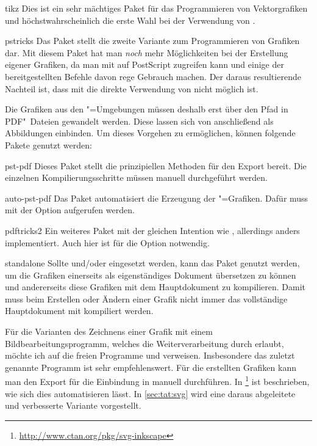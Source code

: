 \documentclass[%
  english,ngerman,%
  headings=optiontoheadandtoc,captions=tableheading,numbers=noenddot,%
  chapterpage,cdfoot,%
]{tudscrman}
\begin{document}
\begin{packages}
\item[tikz]
  Dies ist ein sehr mächtiges Paket für das Programmieren von Vektorgrafiken und 
  höchstwahrscheinlich die erste Wahl bei der Verwendung von .
\item[pstricks]
  Das Paket  stellt die zweite Variante zum Programmieren von 
  Grafiken dar. Mit diesem Paket hat man \emph{noch} mehr Möglichkeiten bei der 
  Erstellung eigener Grafiken, da man mit  auf PostScript 
  zugreifen kann und einige der bereitgestellten Befehle davon rege Gebrauch 
  machen. Der daraus resultierende Nachteil ist, dass mit  
  die direkte Verwendung von  nicht möglich ist.
  
  Die Grafiken aus den "=Umgebungen müssen deshalb erst 
  über den Pfad 
  in PDF"~Dateien gewandelt werden. Diese lassen sich von    
  anschließend als Abbildungen einbinden. Um dieses Vorgehen zu ermöglichen, 
  können folgende Pakete genutzt werden:
  \begin{packages}
  \item[pst-pdf]
    Dieses Paket stellt die prinzipiellen Methoden für den Export bereit. Die 
    einzelnen Kompilierungsschritte müssen manuell durchgeführt werden.
  \item[auto-pst-pdf]
    Das Paket automatisiert die Erzeugung der "=Grafiken. 
    Dafür muss  mit der Option     
    aufgerufen werden.
  \item[pdftricks2]
    Ein weiteres Paket mit der gleichen Intention wie , 
    allerdings anders implementiert. Auch hier ist für  die 
    Option  notwendig.
  \end{packages}
\item[standalone]
  Sollte  und/oder  eingesetzt werden, kann 
  das Paket  genutzt werden, um die Grafiken einerseits als 
  eigenständiges Dokument übersetzen zu können und andererseits diese Grafiken 
  mit dem Hauptdokument zu kompilieren. Damit muss beim Erstellen oder Ändern 
  einer Grafik nicht immer das vollständige Hauptdokument mit kompiliert werden.
\end{packages}
%
Für die Varianten des Zeichnens einer Grafik mit einem Bildbearbeitungsprogramm, 
welches die Weiterverarbeitung durch  erlaubt, möchte ich auf die 
freien Programme  und  verweisen. 
Insbesondere das zuletzt genannte Programm ist sehr empfehlenswert. Für die 
erstellten Grafiken kann man den Export für die Einbindung in  
manuell durchführen. In %
\footnote{\url{http://www.ctan.org/pkg/svg-inkscape}}
ist beschrieben, wie sich dies automatisieren lässt. In \autoref{sec:tat:svg} 
wird eine daraus abgeleitete und verbesserte Variante vorgestellt.
\end{document}
